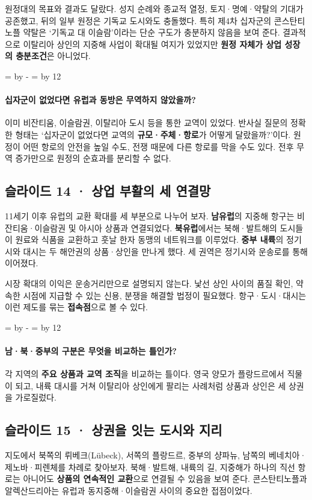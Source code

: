 \documentclass[10pt,a4paper]{article}
\newcommand{\ReserveQuestionSpace}{%
  \par\begingroup
  \dimen0=\pagegoal \advance\dimen0 by -\pagetotal
  \dimen2=\baselineskip \multiply\dimen2 by 12
  \ifdim\dimen0<\dimen2 \newpage\fi
  \endgroup}
\begin{document}
원정대의 목표와 결과도 달랐다. 성지 순례와 종교적 열정, 토지·명예·약탈의 기대가 공존했고, 뒤의 일부 원정은 기독교 도시와도 충돌했다. 특히 제4차 십자군의 콘스탄티노플 약탈은 ‘기독교 대 이슬람’이라는 단순 구도가 충분하지 않음을 보여 준다. 결과적으로 이탈리아 상인의 지중해 사업이 확대될 여지가 있었지만 \textbf{원정 자체가 상업 성장의 충분조건}은 아니었다.\par

\ReserveQuestionSpace
\paragraph{십자군이 없었다면 유럽과 동방은 무역하지 않았을까?}
이미 비잔티움, 이슬람권, 이탈리아 도시 등을 통한 교역이 있었다. 반사실 질문의 정확한 형태는 ‘십자군이 없었다면 교역의 \textbf{규모·주체·항로}가 어떻게 달랐을까?’이다. 원정이 어떤 항로의 안전을 높일 수도, 전쟁 때문에 다른 항로를 막을 수도 있다. 전후 무역 증가만으로 원정의 순효과를 분리할 수 없다.\par

\subsection{슬라이드 14 · 상업 부활의 세 연결망}
11세기 이후 유럽의 교환 확대를 세 부분으로 나누어 보자. \textbf{남유럽}의 지중해 항구는 비잔티움·이슬람권 및 아시아 상품과 연결되었다. \textbf{북유럽}에서는 북해·발트해의 도시들이 원료와 식품을 교환하고 훗날 한자 동맹의 네트워크를 이루었다. \textbf{중부 내륙}의 정기시와 대시는 두 해안권의 상품·상인을 만나게 했다. 세 권역은 정기시와 운송로를 통해 이어졌다.\par

시장 확대의 이익은 운송거리만으로 설명되지 않는다. 낯선 상인 사이의 품질 확인, 약속한 시점에 지급할 수 있는 신용, 분쟁을 해결할 법정이 필요했다. 항구·도시·대시는 이런 제도를 묶는 \textbf{접속점}으로 볼 수 있다.\par

\ReserveQuestionSpace
\paragraph{남·북·중부의 구분은 무엇을 비교하는 틀인가?}
각 지역의 \textbf{주요 상품과 교역 조직}을 비교하는 틀이다. 영국 양모가 플랑드르에서 직물이 되고, 내륙 대시를 거쳐 이탈리아 상인에게 팔리는 사례처럼 상품과 상인은 세 상권을 가로질렀다.\par

\subsection{슬라이드 15 · 상권을 잇는 도시와 지리}
지도에서 북쪽의 뤼베크(Lübeck), 서쪽의 플랑드르, 중부의 샹파뉴, 남쪽의 베네치아·제노바·피렌체를 차례로 찾아보자. 북해·발트해, 내륙의 길, 지중해가 하나의 직선 항로는 아니어도 \textbf{상품의 연속적인 교환}으로 연결될 수 있음을 보여 준다. 콘스탄티노플과 알렉산드리아는 유럽과 동지중해·이슬람권 사이의 중요한 접점이었다.\par
\end{document}
